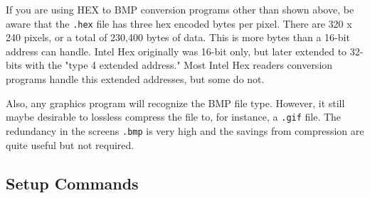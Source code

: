 If you are using HEX to BMP conversion programs other than shown above, be aware that the \texttt{.hex} file has three hex encoded bytes per pixel. There are 320 x 240 pixels, or a total of 230,400 bytes of data. This is more bytes than a 16-bit address can handle. Intel Hex originally was 16-bit only, but later extended to 32-bits with the "type 4 extended address." Most  Intel Hex readers conversion programs handle this extended addresses, but some do not.

Also, any graphics program will recognize the BMP file type. However, it still maybe desirable to lossless compress the file to, for instance, a \texttt{.gif} file. The redundancy in the screens \texttt{.bmp} is very high and the savings from compression are quite useful but not required.

\subsection{Setup Commands}
\label{subsect:SerSetup}
